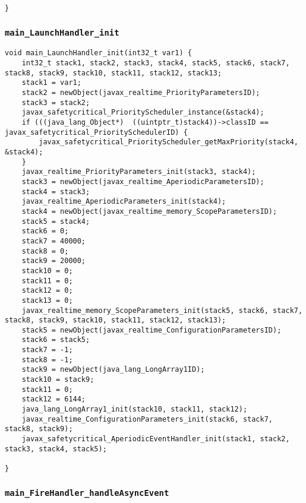 \begin{landscape}
\begin{multicols}{2}
\begin{lstlisting}[firstnumber=2437]
}
\end{lstlisting}

\subsubsection{\texttt{main\_LaunchHandler\_init}}

\begin{lstlisting}[firstnumber=2612]
void main_LaunchHandler_init(int32_t var1) {
	int32_t stack1, stack2, stack3, stack4, stack5, stack6, stack7, stack8, stack9, stack10, stack11, stack12, stack13;
	stack1 = var1;
	stack2 = newObject(javax_realtime_PriorityParametersID);
	stack3 = stack2;
	javax_safetycritical_PriorityScheduler_instance(&stack4);
	if (((java_lang_Object*)  ((uintptr_t)stack4))->classID == javax_safetycritical_PrioritySchedulerID) {
		javax_safetycritical_PriorityScheduler_getMaxPriority(stack4, &stack4);
	}
	javax_realtime_PriorityParameters_init(stack3, stack4);
	stack3 = newObject(javax_realtime_AperiodicParametersID);
	stack4 = stack3;
	javax_realtime_AperiodicParameters_init(stack4);
	stack4 = newObject(javax_realtime_memory_ScopeParametersID);
	stack5 = stack4;
	stack6 = 0;
	stack7 = 40000;
	stack8 = 0;
	stack9 = 20000;
	stack10 = 0;
	stack11 = 0;
	stack12 = 0;
	stack13 = 0;
	javax_realtime_memory_ScopeParameters_init(stack5, stack6, stack7, stack8, stack9, stack10, stack11, stack12, stack13);
	stack5 = newObject(javax_realtime_ConfigurationParametersID);
	stack6 = stack5;
	stack7 = -1;
	stack8 = -1;
	stack9 = newObject(java_lang_LongArray1ID);
	stack10 = stack9;
	stack11 = 0;
	stack12 = 6144;
	java_lang_LongArray1_init(stack10, stack11, stack12);
	javax_realtime_ConfigurationParameters_init(stack6, stack7, stack8, stack9);
	javax_safetycritical_AperiodicEventHandler_init(stack1, stack2, stack3, stack4, stack5);

}
\end{lstlisting}

\subsubsection{\texttt{main\_FireHandler\_handleAsyncEvent}}


\end{multicols}
\end{landscape}

